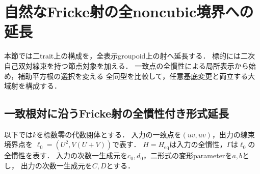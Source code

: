 \section{自然なFricke射の全noncubic境界への延長}
\label{sec:qa-global-fricke-boundary}

本節では二trait上の構成を，全表示groupoid上の射へ延長する．
標的には二次自己双対線束を持つ節点対象を加える．
一致点の全慣性による局所表示から始め，補助平方根の選択を変える
全同型を比較して，任意基底変更と両立する大域射を構成する．

\subsection{一致根対に沿うFricke射の全慣性付き形式延長}

以下では$k$を標数零の代数閉体とする．
入力の一致点を$(uv,uv)$，出力の線束境界点を
$\ell_0=(U^2,V(U+V))$で表す．
$H=H_{\mathrm{eq}}$は入力の全慣性，$\Gamma$は$\ell_0$の全慣性を表す．
入力の次数一生成元を$c_0,d_0$，二形式の変形parameterを$a,b$とし，
出力の次数一生成元を$C,D$とする．

